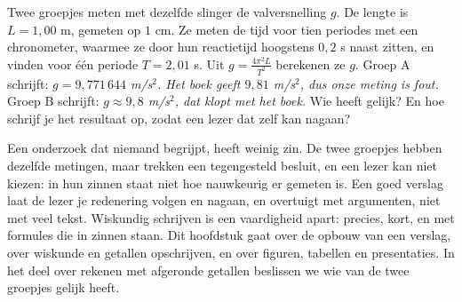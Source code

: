 %


\begin{probleem}
Twee groepjes meten met dezelfde slinger de valversnelling $g$. De lengte is $L = 1{,}00$ m, gemeten op $1$ cm. Ze meten de tijd voor tien periodes met een chronometer, waarmee ze door hun reactietijd hoogstens $0{,}2$ s naast zitten, en vinden voor één periode $T = 2{,}01$ s. Uit $g = \frac{4\pi^2 L}{T^2}$ berekenen ze $g$. Groep A schrijft: \textit{$g = 9{,}771\,644$ m/s$^2$. Het boek geeft $9{,}81$ m/s$^2$, dus onze meting is fout.} Groep B schrijft: \textit{$g \approx 9{,}8$ m/s$^2$, dat klopt met het boek.} Wie heeft gelijk? En hoe schrijf je het resultaat op, zodat een lezer dat zelf kan nagaan?
\end{probleem}


Een onderzoek dat niemand begrijpt, heeft weinig zin. De twee groepjes hebben dezelfde metingen, maar trekken een tegengesteld besluit, en een lezer kan niet kiezen: in hun zinnen staat niet hoe nauwkeurig er gemeten is. Een goed verslag laat de lezer je redenering volgen en nagaan, en overtuigt met argumenten, niet met veel tekst. Wiskundig schrijven is een vaardigheid apart: precies, kort, en met formules die in zinnen staan. Dit hoofdstuk gaat over de opbouw van een verslag, over wiskunde en getallen opschrijven, en over figuren, tabellen en presentaties. In het deel over rekenen met afgeronde getallen beslissen we wie van de twee groepjes gelijk heeft.

\begin{oefeningen}[Start]

\end{oefeningen}

